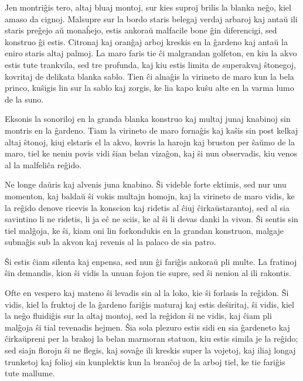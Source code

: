    Jen montri\^gis tero, altaj bluaj montoj, sur kies suproj brilis
la blanka ne\^go, kiel amaso da cignoj. Malsupre sur la bordo staris
belegaj verdaj arbaroj kaj anta\u u ili staris pre\^gejo a\u u
mona\^hejo, estis ankora\u u malfacile bone \^gin diferencigi, sed
konstruo \^gi estis. Citronaj kaj oran\^gaj arboj kreskis en la
\^gardeno kaj anta\u u la eniro staris altaj palmoj. La maro faris
tie \^ci malgrandan golfeton, en kiu la akvo estis tute trankvila,
sed tre profunda, kaj kiu estis limita de superakvaj \^stonegoj,
kovritaj de delikata blanka sablo. Tien \^ci alna\^gis la virineto
de maro kun la bela princo, ku\^sigis lin sur la sablo kaj zorgis,
ke lia kapo ku\^su alte en la varma lumo de la suno.

   Eksonis la sonoriloj en la granda blanka konstruo kaj multaj junaj
knabinoj sin montris en la \^gardeno. Tiam la virineto de maro
forna\^gis kaj ka\^sis sin post kelkaj altaj \^stonoj, kiuj elstaris
el la akvo, kovris la harojn kaj bruston per \^sa\u umo de la maro,
tiel ke neniu povis vidi \^sian belan viza\^gon, kaj \^si nun
observadis, kiu venos al la malfeli\^ca re\^gido.

   Ne longe da\u uris kaj alvenis juna knabino. \^Si videble forte ektimis,
sed nur unu momenton, kaj balda\u u \^si vokis multajn homojn, kaj
la virineto de maro vidis, ke la re\^gido denove ricevis la konscion
kaj ridetis al \^ciuj \^cirka\u ustarantoj, sed al sia savintino li
ne ridetis, li ja e\^c ne sciis, ke al \^si li devas danki la vivon.
\^Si sentis sin tiel mal\^goja, ke \^si, kiam oni lin forkondukis en
la grandan konstruon, malgaje subna\^gis sub la akvon kaj revenis al
la palaco de sia patro.

   \^Si estis \^ciam silenta kaj enpensa, sed nun \^gi fari\^gis ankora\u u
pli multe. La fratinoj \^sin demandis, kion \^si vidis la unuan
fojon tie supre, sed \^si nenion al ili rakontis.

   Ofte en vespero kaj mateno \^si levadis sin al la loko, kie \^si
forlasis la re\^gidon. \^Si vidis, kiel la fruktoj de la \^gardeno
fari\^gis maturaj kaj estis de\^siritaj, \^si vidis, kiel la ne\^go
fluidi\^gis sur la altaj montoj, sed la re\^gidon \^si ne vidis, kaj
\^ciam pli mal\^goja \^si tial revenadis hejmen. \^Sia sola plezuro
estis sidi en sia \^gardeneto kaj \^cirka\u upreni per la brakoj la
belan marmoran statuon, kiu estis simila je la re\^gido; sed siajn
florojn \^si ne flegis, kaj sova\^ge ili kreskis super la vojetoj,
kaj iliaj longaj trunketoj kaj folioj sin kunplektis kun la
bran\^coj de la arboj tiel, ke tie fari\^gis tute mallume.

